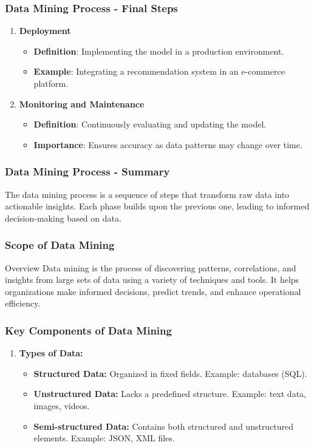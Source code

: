 \documentclass[aspectratio=169]{beamer}
\begin{document}
\begin{frame}[fragile]
    \frametitle{Data Mining Process - Final Steps}
    \begin{enumerate}[resume]
        \item \textbf{Deployment}
        \begin{itemize}
            \item \textbf{Definition}: Implementing the model in a production environment.
            \item \textbf{Example}: Integrating a recommendation system in an e-commerce platform.
        \end{itemize}

        \item \textbf{Monitoring and Maintenance}
        \begin{itemize}
            \item \textbf{Definition}: Continuously evaluating and updating the model.
            \item \textbf{Importance}: Ensures accuracy as data patterns may change over time.
        \end{itemize}
    \end{enumerate}
\end{frame}

\begin{frame}[fragile]
    \frametitle{Data Mining Process - Summary}
    The data mining process is a sequence of steps that transform raw data into actionable insights. Each phase builds upon the previous one, leading to informed decision-making based on data.
\end{frame}

\begin{frame}[fragile]
    \frametitle{Scope of Data Mining}
    \begin{block}{Overview}
    Data mining is the process of discovering patterns, correlations, and insights from large sets of data using a variety of techniques and tools. It helps organizations make informed decisions, predict trends, and enhance operational efficiency.
    \end{block}
\end{frame}

\begin{frame}[fragile]
    \frametitle{Key Components of Data Mining}
    \begin{enumerate}
        \item \textbf{Types of Data:}
            \begin{itemize}
                \item \textbf{Structured Data:} Organized in fixed fields. Example: databases (SQL).
                \item \textbf{Unstructured Data:} Lacks a predefined structure. Example: text data, images, videos.
                \item \textbf{Semi-structured Data:} Contains both structured and unstructured elements. Example: JSON, XML files.
            \end{itemize}
    \end{enumerate}
\end{frame}
\end{document}

